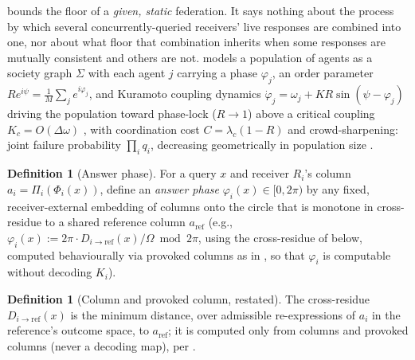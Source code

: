 \documentclass[11pt,twocolumn,a4paper]{article}
\theoremstyle{rdm}
\theoremstyle{definition}
\newtheorem{definition}[theorem]{Definition}
\theoremstyle{remark}
\newcommand{\Know}{K}
\newcommand{\Om}{\Omega}
\newcommand{\Rec}{R}
\newcommand{\dem}{D}
\begin{document}
 bounds the floor of a \emph{given, static}
federation. It says nothing about the process by which several
concurrently-queried receivers' live responses are combined into one, nor
about what floor that combination inherits when some responses are
mutually consistent and others are not. \citet[Def.~10.1,
10.4]{sachikonye-split-attention} models a population of agents as a
society graph $\Sigma$ with each agent $j$ carrying a phase $\varphi_j$, an
order parameter $R e^{i\psi}=\frac1M\sum_je^{i\varphi_j}$, and Kuramoto
coupling dynamics
$\dot\varphi_j=\omega_j+KR\sin(\psi-\varphi_j)$
\citep{kuramoto1975,strogatz2000,acebron2005} driving the population toward
phase-lock ($R\to1$) above a critical coupling $K_c=O(\Delta\omega)$
\citep[Thm.~10.3]{sachikonye-split-attention}, with coordination cost
$C=\lambda_c(1-R)$ \citep[Thm.~10.2]{sachikonye-split-attention} and
crowd-sharpening: joint failure probability $\prod_iq_i$, decreasing
geometrically in population size
\citep[Thm.~10.4]{sachikonye-split-attention}.

\begin{definition}[Answer phase]
\label{def:answer-phase}
For a query $x$ and receiver $\Rec_i$'s column $a_i=\Pi_i(\Phi_i(x))$,
define an \emph{answer phase} $\varphi_i(x)\in[0,2\pi)$ by any fixed,
receiver-external embedding of columns onto the circle that is
monotone in cross-residue to a shared reference column $a_{\mathrm{ref}}$
(e.g., $\varphi_i(x):=2\pi\cdot\dem_{i\to\mathrm{ref}}(x)/\Om \bmod 2\pi$,
using the cross-residue of  below, computed
behaviourally via provoked columns as in , so that
$\varphi_i$ is computable without decoding $\Know_i$).
\end{definition}

\begin{definition}[Column and provoked column, restated]
\label{def:column-recap}
\label{def:provoked-recap}
The cross-residue $\dem_{i\to\mathrm{ref}}(x)$ is the minimum distance, over
admissible re-expressions of $a_i$ in the reference's outcome space, to
$a_{\mathrm{ref}}$; it is computed only from columns and provoked columns
(never a decoding map), per
\citet[Def.~8.2--8.4]{sachikonye-accountable-compilation}.
\end{definition}
\end{document}
